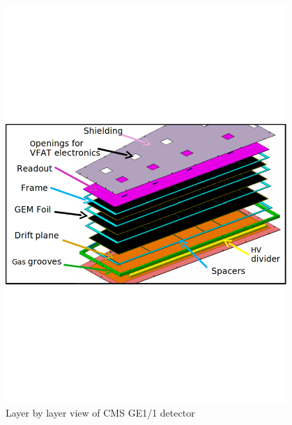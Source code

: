 \begin{figure}[!htbp]
    \begin{center}
        \includegraphics[width=0.95\textwidth]{figures/GEM/GE11cad.pdf}
        \caption{Layer by layer view of CMS GE1/1 detector}
        \label{fig:GE1/1}
    \end{center}
\end{figure} 

